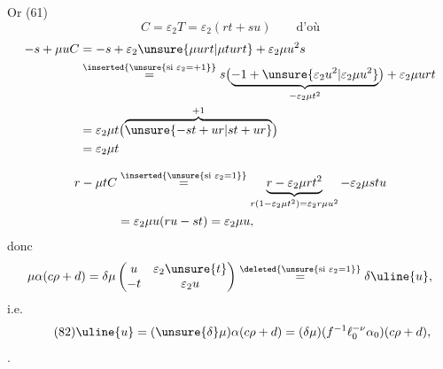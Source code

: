 Or (61)
\[
C=\varepsilon_2T=\varepsilon_2(rt+su)\qquad\text{d'où}
\]
\[
\begin{aligned}
-s+\mu uC
&=-s+\varepsilon_2\unsure{\mu urt|\mu turt}+\varepsilon_2\mu u^2s\\
&\overset{\inserted{\unsure{\text{si }\varepsilon_2=+1}}}{=}
 s\bigl(\underbrace{-1+\unsure{\varepsilon_2u^2|\varepsilon_2\mu u^2}}_{-\varepsilon_2\mu t^2}\bigr)
 +\varepsilon_2\mu urt\\
&=\varepsilon_2\mu t\bigl(\overbrace{\unsure{-st+ur|st+ur}}^{+1}\bigr)\\
&=\varepsilon_2\mu t
\end{aligned}
\]



\[
\begin{aligned}
r-\mu tC
&\overset{\inserted{\unsure{\text{si }\varepsilon_2=1}}}{=}
\underbrace{r-\varepsilon_2\mu rt^2}_{r(1-\varepsilon_2\mu t^2)=\varepsilon_2r\mu u^2}
-\varepsilon_2\mu stu\\
&=\varepsilon_2\mu u(ru-st)=\varepsilon_2\mu u,
\end{aligned}
\]
donc
\[
\mu\alpha(c\rho+d)
=\delta\mu\begin{pmatrix}u&\varepsilon_2\unsure{t}\\-t&\varepsilon_2u\end{pmatrix}
\overset{\deleted{\unsure{\text{si }\varepsilon_2=1}}}{=}\delta\uline{u},
\]
i.e.
\[
\tag{82}
\uline{u}=(\unsure{\delta}\mu)\alpha(c\rho+d)
=(\delta\mu)(f^{-1}\ell_0^{-\nu}\alpha_0)(c\rho+d),
\]
.

